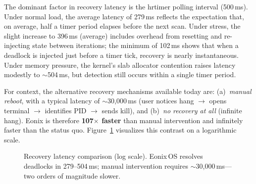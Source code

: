 \documentclass[11pt,letterpaper]{article}
\begin{document}
The dominant factor in recovery latency is the hrtimer polling interval
(500\,ms).  Under normal load, the average latency of 279\,ms reflects
the expectation that, on average, half a timer period elapses before
the next scan.  Under stress, the slight increase to 396\,ms (average)
includes overhead from resetting and re-injecting state between
iterations; the minimum of 102\,ms shows that when a deadlock is
injected just before a timer tick, recovery is nearly instantaneous.
Under memory pressure, the kernel's slab allocator contention raises
latency modestly to $\sim$504\,ms, but detection still occurs within a
single timer period.

For context, the alternative recovery mechanisms available today are:
(a)~\emph{manual reboot}, with a typical latency of $\sim$30,000\,ms
(user notices hang $\to$ opens terminal $\to$ identifies PID $\to$
sends kill), and (b)~\emph{no recovery at all} (infinite hang).  Eonix
is therefore \textbf{107$\times$ faster} than manual intervention and
infinitely faster than the status quo.
Figure~\ref{fig:latency-comparison} visualizes this contrast on a
logarithmic scale.

\begin{figure}[h]
\centering
{}
\caption{Recovery latency comparison (log scale).  Eonix\,OS resolves
  deadlocks in 279--504\,ms; manual intervention requires
  $\sim$30,000\,ms---two orders of magnitude slower.}
\label{fig:latency-comparison}
\end{figure}
\end{document}
